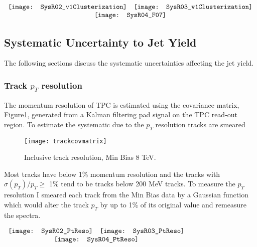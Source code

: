 \begin{figure*}[t!]
$\begin{array}{rl}
    \texttt{[image: SysR02\_v1Clusterization]} &
    \texttt{[image: SysR03\_v1Clusterization]}\\
    \multicolumn{2}{c}{\texttt{[image: SysR04\_F07]}}
\end{array}$
\caption[Systematic due to clusterization algorithm.]{\label{fig:cluseff}Systematic due to EMCal clusterization algorithm; R = 0.2 \textit{(top left)}, R = 0.3 \textit{(top right)}, R = 0.4 \textit{(bottom)}.}
\end{figure*}

\subsection{Systematic Uncertainty to Jet Yield}
The following sections discuss the systematic uncertainties affecting the jet yield.

\subsubsection{Track $p_{T}$ resolution}
The momentum resolution of TPC is estimated using the covariance matrix, Figure\ref{fig:trackpcovmatrix}, generated from a Kalman filtering\cite{Fruhwirth:1987fm} pad signal on the TPC read-out region.  To estimate the systematic due to the $p_{T}$ resolution tracks are smeared 

\begin{figure}[h]
\texttt{[image: trackcovmatrix]}
\centering
\caption{Inclusive track resolution, Min Bias 8 TeV.}
\label{fig:trackpcovmatrix}
\end{figure}

Most tracks have below 1\% momentum resolution and the tracks with $\sigma(p_{T})/p_{T} \geq$ 1\% tend to be tracks below 200 MeV tracks.  To measure the $p_{T}$ resolution I smeared each track from the Min Bias data by a Gaussian function which would alter the track $p_{T}$ by up to 1\% of its original value and remeasure the spectra.  

\begin{figure*}[t!]
$\begin{array}{rl}
    \texttt{[image: SysR02\_PtReso]} &
    \texttt{[image: SysR03\_PtReso]}\\
    \multicolumn{2}{c}{\texttt{[image: SysR04\_PtReso]}}
\end{array}$
\caption[Systematic due to $P_{T}$ resolution.]{\label{fig:pTeff}$P_{T}$ resolution; R = 0.2 \textit{(top left)}, R = 0.3 \textit{(top right)}, R = 0.4 \textit{(bottom)}.}
\end{figure*}


